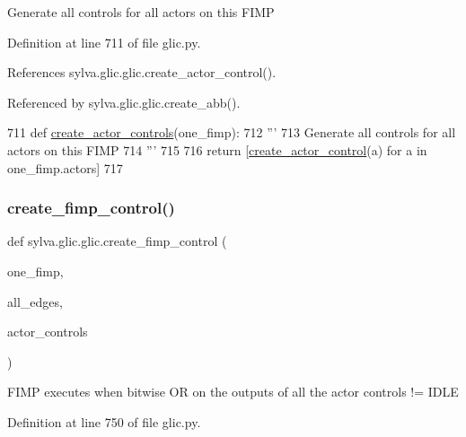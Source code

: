 \begin{DoxyVerb}  Generate all controls for all actors on this FIMP
\end{DoxyVerb}
 

Definition at line 711 of file glic.\+py.



References sylva.\+glic.\+glic.\+create\+\_\+actor\+\_\+control().



Referenced by sylva.\+glic.\+glic.\+create\+\_\+abb().


\begin{DoxyCode}
711   \textcolor{keyword}{def }\hyperlink{namespacesylva_1_1glic_1_1glic_a0b179ee41ee4494cf7450be4ca272db4}{create\_actor\_controls}(one\_fimp):
712     \textcolor{stringliteral}{'''}
713 \textcolor{stringliteral}{      Generate all controls for all actors on this FIMP}
714 \textcolor{stringliteral}{    '''}
715 
716     \textcolor{keywordflow}{return} [\hyperlink{namespacesylva_1_1glic_1_1glic_ae31a233cafcb3a83bd369c491b133b91}{create\_actor\_control}(a) \textcolor{keywordflow}{for} a \textcolor{keywordflow}{in} one\_fimp.actors]
717 
\end{DoxyCode}
\mbox{\label{namespacesylva_1_1glic_1_1glic_a1cdd3394b53489429bc51c8206e1180e}} 
\subsubsection{\texorpdfstring{create\+\_\+fimp\+\_\+control()}{create\_fimp\_control()}}
{\footnotesize\ttfamily def sylva.\+glic.\+glic.\+create\+\_\+fimp\+\_\+control (\begin{DoxyParamCaption}\item[{}]{one\+\_\+fimp,  }\item[{}]{all\+\_\+edges,  }\item[{}]{actor\+\_\+controls }\end{DoxyParamCaption})}

\begin{DoxyVerb}  FIMP executes when
    bitwise OR on the outputs of all the actor controls != IDLE
\end{DoxyVerb}
 

Definition at line 750 of file glic.\+py.



